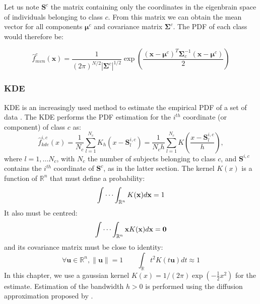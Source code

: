 Let us note $\mathbf{S}^{c}$ the matrix containing only the coordinates in the eigenbrain space of individuals belonging to class $c$. From this matrix we can obtain the mean vector for all components $\boldsymbol\mu^{c}$ and covariance matrix $\boldsymbol{\Sigma}^{c}$. The \ac{PDF} of each class would therefore be: 

\begin{equation}
\hat{f}_{mvn}^{c}(\mathbf{x}) = \frac{1}{(2\pi)^{N/2}\left|\boldsymbol{\Sigma}^{c}\right|^{1/2}} \exp{ \left(\frac{(\mathbf{x}-\boldsymbol\mu^{c})^T \boldsymbol{\Sigma}_{c}^{-1}(\mathbf{x}-\boldsymbol\mu^{c})}{2}\right)}
\end{equation}

\subsubsection{\acf{KDE}}
\acf{KDE} is an increasingly used method to estimate the empirical \ac{PDF} of a set of data \cite{Botev2010,Simonoff2012}. The \ac{KDE} performs the \ac{PDF} estimation for the $i^{th}$ coordinate (or component) of class $c$ as: 
\begin{equation}
\hat{f}_{kde}^{i,c}(x) = \frac{1}{N_c}\sum_{l=1}^{N_c} K_h \left(x - \mathbf{S}^{i,c}_l\right) = \frac{1}{N_c h} \sum_{l=1}^{N_c} K\left(\frac{x-\mathbf{S}^{i,c}_l}{h}\right),
\end{equation}
where $l=1,\dots N_c$, with $N_c$ the number of subjects belonging to class $c$, and $\mathbf{S}^{i,c}$ contains the $i^{th}$ coordinate of $\mathbf{S}^{c}$, as in the latter section. The kernel $K(x)$ is a function of $\mathbb{R}^n$ that must define a probability: 
\begin{equation}
\idotsint_{\mathbb{R}^n} K(\mathbf{x}) d\mathbf{x} = 1
\end{equation}
It also must be centred:
\begin{equation}
\idotsint_{\mathbb{R}^n} \mathbf{x}K(\mathbf{x}) d\mathbf{x} =
\mathbf{0}
\end{equation}
and its covariance matrix must be close to identity:
\begin{equation}
\forall \mathbf{u}\in\mathbb{R}^n, \|\mathbf{u}\| = 1\qquad\int_{\mathbb{R}} t^2K(t \mathbf{u}) dt \approx	1
\end{equation}
In this chapter, we use a gaussian kernel $K(x)=1/(2\pi)\exp(-\frac{1}{2}x^2)$ for the estimate. Estimation of the bandwidth $h>0$ is performed using the diffusion approximation proposed by \cite{Botev2010}.

